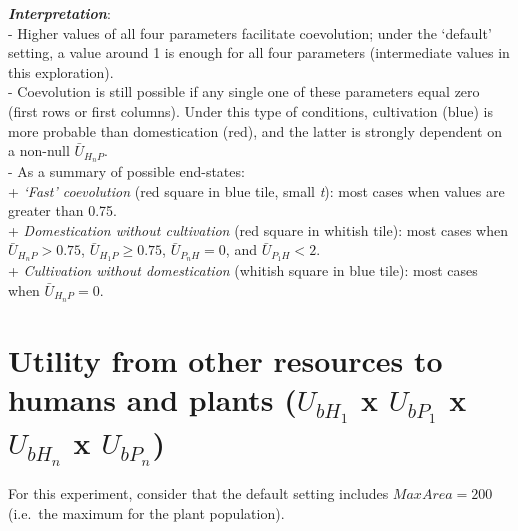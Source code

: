 \documentclass[]{book}
\begin{document}
\textbf{\emph{Interpretation}}:\\
- Higher values of all four parameters facilitate coevolution; under the `default' setting, a value around 1 is enough for all four parameters (intermediate values in this exploration).\\
- Coevolution is still possible if any single one of these parameters equal zero (first rows or first columns). Under this type of conditions, cultivation (blue) is more probable than domestication (red), and the latter is strongly dependent on a non-null \(\bar{U}_{H_{n}P}\).\\
- As a summary of possible end-states:\\
+ \emph{`Fast' coevolution} (red square in blue tile, small \emph{t}): most cases when values are greater than 0.75.\\
+ \emph{Domestication without cultivation} (red square in whitish tile): most cases when \(\bar{U}_{H_{n}P}>0.75\), \(\bar{U}_{H_{1}P}\geq 0.75\), \(\bar{U}_{P_{n}H}=0\), and \(\bar{U}_{P_{1}H}<2\).\\
+ \emph{Cultivation without domestication} (whitish square in blue tile): most cases when \(\bar{U}_{H_{n}P} = 0\).

\newpage

\hypertarget{utility-from-other-resources-to-humans-and-plants-u_bh_1-x-u_bp_1-x-u_bh_n-x-u_bp_n}{%
\section{\texorpdfstring{Utility from other resources to humans and plants (\(U_{bH_{1}}\) x \(U_{bP_{1}}\) x \(U_{bH_{n}}\) x \(U_{bP_{n}}\))}{Utility from other resources to humans and plants (U\_\{bH\_\{1\}\} x U\_\{bP\_\{1\}\} x U\_\{bH\_\{n\}\} x U\_\{bP\_\{n\}\})}}\label{utility-from-other-resources-to-humans-and-plants-u_bh_1-x-u_bp_1-x-u_bh_n-x-u_bp_n}}


For this experiment, consider that the default setting includes \(MaxArea=200\) (i.e.~the maximum for the plant population).
\end{document}
